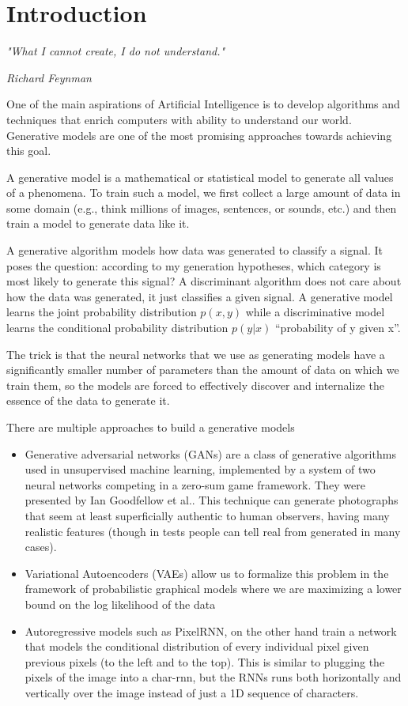 \chapter{Introduction}\label{ch:introduction}

\epigraph{\textit{\Large "What I cannot create, I do not understand."}}{\textit{ \Large Richard Feynman}}
One of the main aspirations of Artificial Intelligence is to develop algorithms and techniques that enrich computers with ability to understand our world. Generative models are one of the most promising approaches towards achieving this goal.\par\bigskip
A generative model is a mathematical or statistical model to generate all values of a phenomena. To train such a model, we first collect a large amount of data in some domain (e.g., think millions of images, sentences, or sounds, etc.) and then train a model to generate data like it.\par\bigskip
A generative algorithm models how data was generated to classify a signal. It poses the question: according to my generation hypotheses, which category is most likely to generate this signal? A discriminant algorithm does not care about how the data was generated, it just classifies a given signal. A generative model learns the joint probability distribution $p(x,y)$ while a discriminative model learns the conditional probability distribution $p(y|x)$ “probability of y given x”.\par\bigskip
The trick is that the neural networks that we use as generating models have a significantly smaller number of parameters than the amount of data on which we train them, so the models are forced to effectively discover and internalize the essence of the data to generate it.\par\bigskip
There are multiple approaches to build a generative models
\begin{itemize}
  \item Generative adversarial networks (GANs) are a class of generative algorithms used in unsupervised machine learning, implemented by a system of two neural networks competing in a zero-sum game framework. They were presented by Ian Goodfellow et al.\cite{gan}. This technique can generate photographs that seem at least superficially authentic to human observers, having many realistic features (though in tests people can tell real from generated in many cases).
  \item Variational Autoencoders (VAEs) allow us to formalize this problem in the framework of probabilistic graphical models where we are maximizing a lower bound on the log likelihood of the data
  \item Autoregressive models such as PixelRNN, on the other hand train a network that models the conditional distribution of every individual pixel given previous pixels (to the left and to the top). This is similar to plugging the pixels of the image into a char-rnn, but the RNNs runs both horizontally and vertically over the image instead of just a 1D sequence of characters.
\end{itemize} \par
